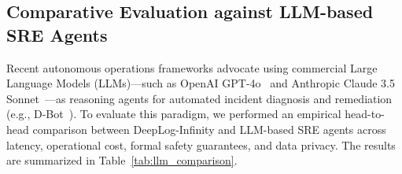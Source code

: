 \documentclass[letterpaper,twocolumn,10pt]{article}
\begin{document}
\subsection{Comparative Evaluation against LLM-based SRE Agents}
\label{sec:llm_comparison}
Recent autonomous operations frameworks advocate using commercial Large Language Models (LLMs)---such as OpenAI GPT-4o~\cite{achiam2023gpt4} and Anthropic Claude 3.5 Sonnet~\cite{anthropic2024claude}---as reasoning agents for automated incident diagnosis and remediation (e.g., D-Bot~\cite{chen2024dbot}). To evaluate this paradigm, we performed an empirical head-to-head comparison between DeepLog-Infinity and LLM-based SRE agents across latency, operational cost, formal safety guarantees, and data privacy. The results are summarized in Table~\ref{tab:llm_comparison}.

\begin{table}[t]
\centering
\footnotesize
\setlength{\tabcolsep}{2.0pt}
\caption{Comparative Evaluation: DeepLog-Infinity vs. Commercial LLM-based SRE Agents and Traditional Runbooks.}
\label{tab:llm_comparison}
\end{table}
\end{document}
